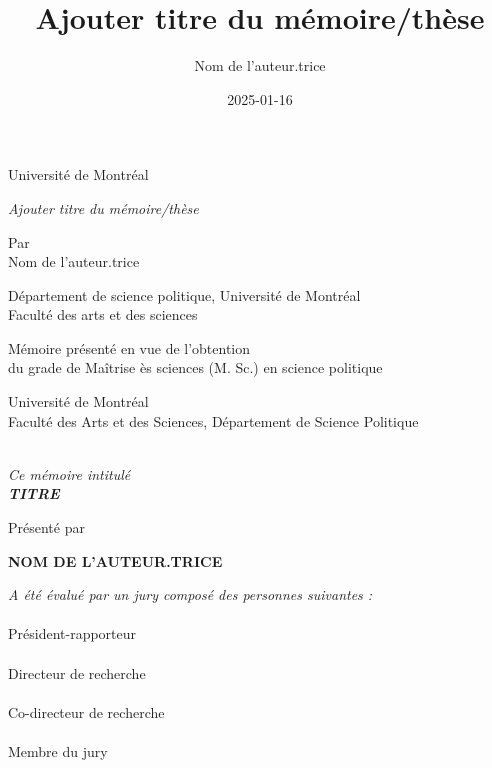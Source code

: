\documentclass[
  12pt,
  letterpaper,
]{report}
\title{Ajouter titre du mémoire/thèse}
\author{Nom de l'auteur.trice}
\date{2025-01-16}
\begin{document}
\cleardoublepage
\thispagestyle{empty}
{\centering
Université de Montréal \\[2.5cm]
{\itshape Ajouter titre du mémoire/thèse \par}
\vspace{2.5cm}
{Par \\ Nom de l'auteur.trice \par} %
\vspace{2.5cm}
{Département de science politique, Université de Montréal \\ 
Faculté des arts et des sciences \par}
\vspace{2.5cm}
{Mémoire présenté en vue de l'obtention \\ 
du grade de Maîtrise ès sciences (M. Sc.) en science politique \par}
\vspace{2.5cm}
{ \par} %
\vspace{2.5cm}
{\textcopyright{} } %
\clearpage
}
{\centering
Université de Montréal \\
Faculté des Arts et des Sciences, Département de Science Politique \\
\hrulefill \\[2.5cm]
{\itshape Ce mémoire intitulé \\
\textbf{ TITRE } \par}  %
\vspace{2.5cm}
Présenté par \\
{\textbf{NOM DE L'AUTEUR.TRICE} \par}  %
\vspace{2.5cm}
{\itshape A été évalué par un jury composé des personnes suivantes :} \\[1cm]
{\textbf{ }} \\ Président-rapporteur \\[1cm] %
{\textbf{ }} \\ Directeur de recherche \\[1cm] %
{\textbf{ }} \\ Co-directeur de recherche \\[1cm] %
{\textbf{ }} \\ Membre du jury \\ %
}
\cleardoublepage
\thispagestyle{plain}
\end{document}
